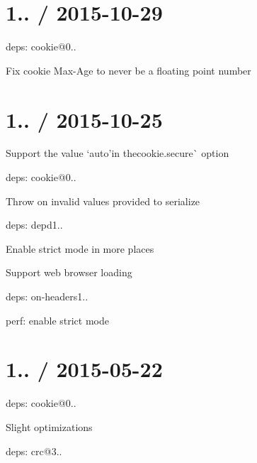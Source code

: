 \section*{1.. / 2015-\/10-\/29 }


\begin{DoxyItemize}
\item deps\+: cookie@0..
\begin{DoxyItemize}
\item Fix cookie {\ttfamily Max-\/\+Age} to never be a floating point number
\end{DoxyItemize}
\end{DoxyItemize}

\section*{1.. / 2015-\/10-\/25 }


\begin{DoxyItemize}
\item Support the value `\textquotesingle{}auto'{\ttfamily in the}cookie.\+secure\`{} option
\item deps\+: cookie@0..
\begin{DoxyItemize}
\item Throw on invalid values provided to {\ttfamily serialize}
\end{DoxyItemize}
\item deps\+: depd1..
\begin{DoxyItemize}
\item Enable strict mode in more places
\item Support web browser loading
\end{DoxyItemize}
\item deps\+: on-\/headers1..
\begin{DoxyItemize}
\item perf\+: enable strict mode
\end{DoxyItemize}
\end{DoxyItemize}

\section*{1.. / 2015-\/05-\/22 }


\begin{DoxyItemize}
\item deps\+: cookie@0..
\begin{DoxyItemize}
\item Slight optimizations
\end{DoxyItemize}
\item deps\+: crc@3..
\end{DoxyItemize}

